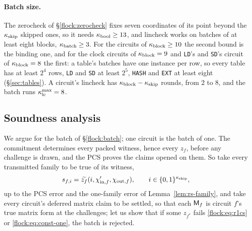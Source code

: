 \paragraph{Batch size.} The zerocheck of \S\ref{flock:zerocheck} fixes seven coordinates of its point beyond the $\kappa_{\mathrm{skip}}$ skipped ones, so it needs $\kappa_{\mathrm{bool}}\ge13$, and lincheck works on batches of at least eight blocks, $\kappa_{\mathrm{batch}}\ge3$. For the circuits of $\kappa_{\mathrm{block}}\ge10$ the second bound is the binding one, and for the clock circuits of $\kappa_{\mathrm{block}}=9$ and \texttt{LD}'s and \texttt{SD}'s circuit of $\kappa_{\mathrm{block}}=8$ the first: a table's batches have one instance per row, so every table has at least $2^{4}$ rows, \texttt{LD} and \texttt{SD} at least $2^{5}$, \texttt{HASH} and \texttt{EXT} at least eight (\S\ref{sec:tables}). A circuit's lincheck has $\kappa_{\mathrm{block}}-\kappa_{\mathrm{skip}}$ rounds, from $2$ to $8$, and the batch runs $\kappa_{\mathrm{lc}}^{\max}=8$.

\subsection{Soundness analysis}\label{flock:soundness}

We argue for the batch of \S\ref{flock:batch}; one circuit is the batch of one. The commitment determines every packed witness, hence every $z_f$, before any challenge is drawn, and the PCS proves the claims opened on them. So take every transmitted family to be true of its witness,
\[
s_{f,i}=\widetilde{z_f}(i,\chi'_{\mathrm{in},f},\chi_{\mathrm{out},f}),\qquad i\in\{0,1\}^{\kappa_{\mathrm{skip}}},
\]
up to the PCS error and the one-family error of Lemma~\ref{lem:rs-family}, and take every circuit's deferred matrix claim to be settled, so that each $\mathsf{M}_{f}$ is circuit $f$'s true matrix form at the challenges; let us show that if some $z_{f^\ast}$ fails \eqref{flock:eq:r1cs} or \eqref{flock:eq:const-one}, the batch is rejected.

